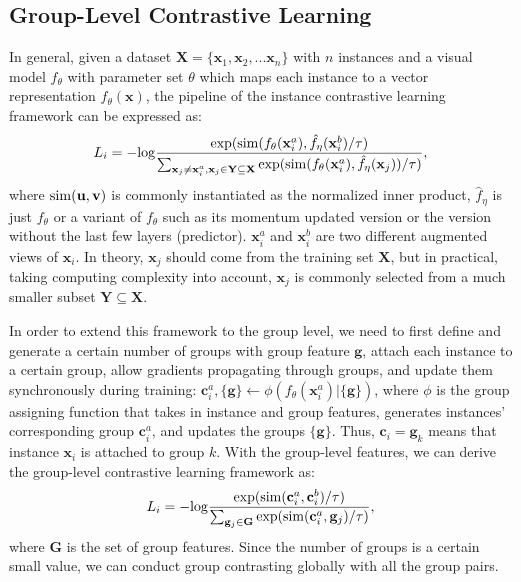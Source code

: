\documentclass[runningheads]{style/llncs}
\begin{document}
\subsection{Group-Level Contrastive Learning}
In general, given a dataset $\mathbf{X}=\{\mathbf{x}_1, \mathbf{x}_2, ...\mathbf{x}_n\}$ with $n$ instances and a visual model $f_\theta$ with parameter set $\theta$ which maps each instance to a vector representation $f_\theta(\mathbf{x})$, the pipeline of the instance contrastive learning framework can be expressed as:
\begin{equation}
L_i = -{\rm log}\frac{{\rm exp}({\rm sim}(f_\theta(\mathbf{x}_i^a), \hat f_\eta(\mathbf{x}_i^b) /\tau)}{\sum_{\mathbf{x}_j\neq \mathbf{x}_i^a, \mathbf{x}_j\in \mathbf{Y}\subseteq \mathbf{X}}{{\rm exp}({\rm sim}(f_\theta(\mathbf{x}_i^a), \hat f_\eta(\mathbf{x}_j) )/\tau)}},
\end{equation}
where ${\rm sim}(\mathbf{u}, \mathbf{v})$ is commonly instantiated as the normalized inner product, $\hat f_\eta$ is just $f_\theta$ or a variant of $f_\theta$ such as its momentum updated version or the version without the last few layers (predictor). $\mathbf{x}_i^a$ and $\mathbf{x}_i^b$ are two different augmented views of $\mathbf{x}_i$. In theory, $\mathbf{x}_j$ should come from the training set $\mathbf{X}$, but in practical, taking computing complexity into account, $\mathbf{x}_j$ is commonly selected from a much smaller subset $\mathbf{Y}\subseteq \mathbf{X}$.

In order to extend this framework to the group level, we need to first define and generate a certain number of groups with group feature $\mathbf{g}$, attach each instance to a certain group, allow gradients propagating through groups, and update them synchronously during training: $\mathbf{c}_i^a, \{\mathbf{g}\} \leftarrow \phi(f_\theta(\mathbf{x}_i^a) | \{\mathbf{g}\})$, where $\phi$ is the group assigning function that takes in instance and group features, generates instances' corresponding group $\mathbf{c}_i^a$, and updates the groups $\{\mathbf{g}\}$. Thus, $\mathbf{c}_i = \mathbf{g}_k$ means that instance $\mathbf{x}_i$ is attached to group $k$. With the group-level features, we can derive the group-level contrastive learning framework as:
\begin{equation}
L_i = -{\rm log}\frac{{\rm exp}({\rm sim}(\mathbf{c}_i^a, \mathbf{c}_i^b)/\tau)}{\sum_{\mathbf{g}_j \in \mathbf{G}}{\rm exp}({\rm sim}(\mathbf{c}_i^a, \mathbf{g}_j)/\tau)},
\label{eq:pureGroup}
\end{equation}
where $\mathbf{G}$ is the set of group features. Since the number of groups is a certain small value, we can conduct group contrasting globally with all the group pairs.
\end{document}
